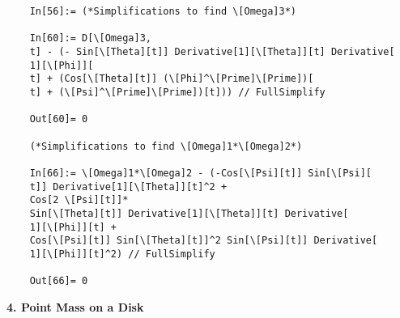 \documentclass{article}
\theoremstyle{definition}
\begin{document}
\begin{enumerate}[label=(\alph*)]
\begin{lstlisting}
	In[56]:= (*Simplifications to find \[Omega]3*)
	
	In[60]:= D[\[Omega]3, 
	t] - (- Sin[\[Theta][t]] Derivative[1][\[Theta]][t] Derivative[
	1][\[Phi]][
	t] + (Cos[\[Theta][t]] (\[Phi]^\[Prime]\[Prime])[
	t] + (\[Psi]^\[Prime]\[Prime])[t])) // FullSimplify
	
	Out[60]= 0
	
	(*Simplifications to find \[Omega]1*\[Omega]2*)
	
	In[66]:= \[Omega]1*\[Omega]2 - (-Cos[\[Psi][t]] Sin[\[Psi][
	t]] Derivative[1][\[Theta]][t]^2 + 
	Cos[2 \[Psi][t]]*
	Sin[\[Theta][t]] Derivative[1][\[Theta]][t] Derivative[
	1][\[Phi]][t] + 
	Cos[\[Psi][t]] Sin[\[Theta][t]]^2 Sin[\[Psi][t]] Derivative[
	1][\[Phi]][t]^2) // FullSimplify
	
	Out[66]= 0
	\end{lstlisting}
\end{enumerate}






\noindent \textbf{4. Point Mass on a Disk}
\end{document}
